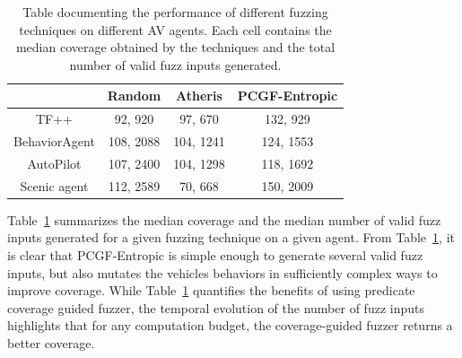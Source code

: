 \begin{table}[]
    \centering
\begin{tabular}{|c|c|c|c|}
\hline
 & Random & Atheris & PCGF-Entropic\\
\hline
TF++ & 92, 920 & 97, 670 & 132, 929 \\
BehaviorAgent & 108, 2088 & 104, 1241 & 124, 1553 \\
AutoPilot & 107, 2400 & 104, 1298 & 118, 1692 \\
Scenic agent & 112, 2589 & 70, 668 & 150, 2009 \\
\hline
\end{tabular}
    \caption{Table documenting the performance of different fuzzing techniques on different AV agents. Each cell contains the median coverage obtained by the techniques and the total number of valid fuzz inputs generated.}
    \label{tab:all-medians}
\end{table}

Table~\ref{tab:all-medians} summarizes the median coverage and the median number of valid fuzz inputs generated for a given fuzzing technique on a given agent.
% 
% 
From Table~\ref{tab:all-medians}, it is clear that PCGF-Entropic is simple enough to generate several valid fuzz inputs, but also mutates the vehicles behaviors in sufficiently complex ways to improve coverage.
% 
While Table~\ref{tab:all-medians} quantifies the benefits of using predicate coverage guided fuzzer, the temporal evolution of the number of fuzz inputs highlights that for any computation budget, the coverage-guided fuzzer returns a better coverage.
 

